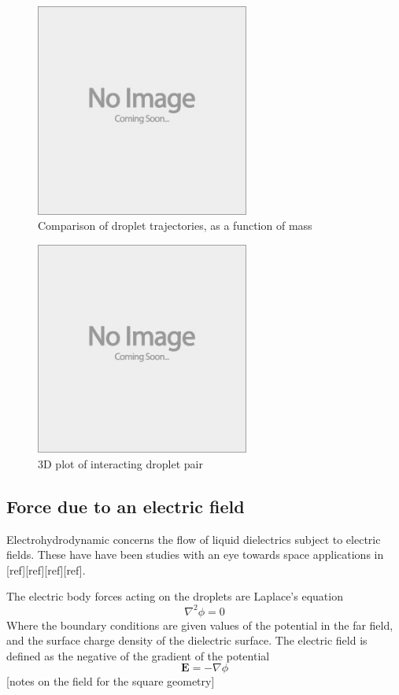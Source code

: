 \documentclass{jfm}
\begin{document}
\begin{figure}
  \centerline{\includegraphics[height=7cm,width=7cm]{e88_1_thumb.jpg}}
  \caption{Comparison of droplet trajectories, as a function of mass}
\label{fig:trajectories}
\end{figure}

\begin{figure}
  \centerline{\includegraphics[height=7cm,width=7cm]{e88_1_thumb.jpg}}
  \caption{3D plot of interacting droplet pair}
\label{fig:3d}
\end{figure}

\subsection{Force due to an electric field}
Electrohydrodynamic concerns the flow of liquid dielectrics subject to electric fields. These have have been studies with an eye towards space applications in [ref][ref][ref][ref].

The electric body forces acting on the droplets are
Laplace's equation
\[ \nabla^2 \phi = 0\]
Where the boundary conditions are given values of the potential in the far field, and the surface charge density of the dielectric surface. The electric field is defined as the negative of the gradient of the potential
\[ \mathbf{E} = - \nabla \phi \]
[notes on the field for the square geometry]
\end{document}
